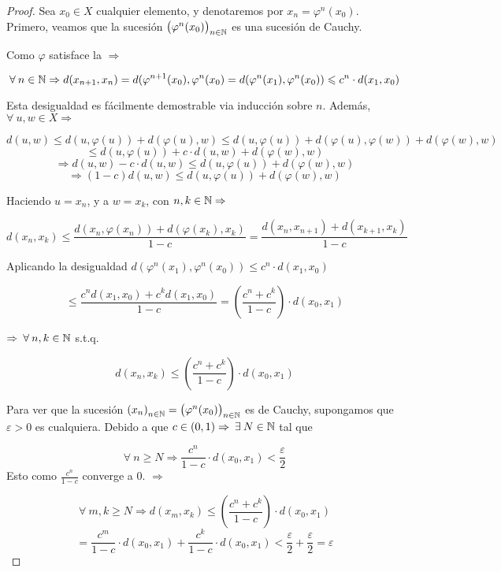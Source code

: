 \begin{proof}
    Sea $x_0 \in X$ cualquier elemento, y denotaremos por $x_n = \varphi^n (x_0)$. Primero, veamos que la sucesión ${\left( \varphi^n (x_0) \right)}_{n \in \mathbb{N}}$ es una sucesión de Cauchy.

    Como $\varphi$ satisface la  $\Rightarrow$

    $$\forall \: n \in \mathbb{N} \Rightarrow d(x_{n+1},x_n) = d(\varphi^{n+1}(x_0), \varphi^n(x_0) = d(\varphi^n(x_1),\varphi^n(x_0)) \leqslant c^n \cdot d(x_1,x_0)$$

    Esta desigualdad es fácilmente demostrable via inducción sobre $n$. Además, $\forall \: u, w \in X \Rightarrow$

    $$d(u,w) \leqslant d(u, \varphi(u)) + d(\varphi(u),w) \leqslant d(u, \varphi(u)) + d(\varphi(u),\varphi(w)) + d(\varphi(w),w)$$
    $$\leqslant  d(u, \varphi(u)) + c \cdot d(u,w) + d(\varphi(w),w) $$
    $$\Rightarrow d(u,w) - c \cdot d(u,w) \leqslant d(u, \varphi(u)) + d(\varphi(w),w)$$
    $$\Rightarrow (1-c)d(u,w)  \leqslant d(u, \varphi(u)) + d(\varphi(w),w)$$

    Haciendo $u = x_n$, y a $w = x_k$, con $n, k \in \mathbb{N} \Rightarrow$

    $$ d(x_n,x_k)  \leqslant \frac{ d(x_n, \varphi(x_n)) + d(\varphi(x_k),x_k)}{1-c} = \frac{ d(x_n, x_{n+1}) + d(x_{k+1},x_k)}{1-c} $$

    Aplicando la desigualdad $d(\varphi^n(x_1),\varphi^n(x_0)) \leqslant c^n \cdot d(x_1,x_0)$

    $$\leqslant \frac{ {c}^{n} d(x_1, x_0) + {c}^{k} d(x_1,x_0)}{1-c} = \left( \frac{c^n + c^k}{1-c} \right) \cdot d(x_0,x_1)$$

    $\Rightarrow \: \forall \: n , k \in \mathbb{N}$ s.t.q. 

    $$d(x_n,x_k)  \leqslant \left( \frac{c^n + c^k}{1-c} \right) \cdot d(x_0,x_1)$$

    Para ver que la sucesión ${\left( x_n \right)}_{n \in \mathbb{N}} = {\left( \varphi^n (x_0) \right)}_{n \in \mathbb{N}}$ es de Cauchy, supongamos que $\varepsilon > 0$ es cualquiera. Debido a que $c \in (0,1) \Rightarrow \: \exists \: N \in \mathbb{N}$ tal que

    $$\forall \: n \geqslant N \Rightarrow \frac{c^n}{1-c} \cdot d(x_0,x_1) < \frac{\varepsilon}{2} $$
    Esto como $\frac{c^n}{1-c}$ converge a 0. $\Rightarrow$

    $$\forall \: m, k  \geqslant N \Rightarrow d(x_m, x_k) \leqslant  \left( \frac{c^n + c^k}{1-c} \right) \cdot d(x_0,x_1) $$
    $$= \frac{c^m}{1-c} \cdot d(x_0,x_1) + \frac{c^k}{1-c} \cdot d(x_0,x_1) < \frac{\varepsilon}{2} + \frac{\varepsilon}{2} = \varepsilon$$


\end{proof}
